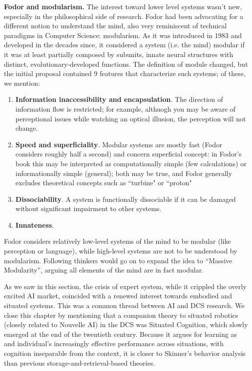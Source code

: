 \documentclass[../main.tex]{subfiles}
\begin{document}
\vspace{4pt}
\textbf{Fodor and modularism.}
The interest toward lower level systems wasn't new, especially in the philosophical side of research. Fodor had been advocating for a different notion to understand the mind, also very reminiscent of technical paradigms in Computer Science: modularism. As it was introduced in 1983\cite{fodorModularityMind1983} and developed in the decades since, it considered a system (i.e. the mind) modular if it was at least partially composed by subunits, innate neural structures with distinct, evolutionary-developed functions. The definition of module changed, but the initial proposal contained 9 features that characterize such systems; of these, we mention:
\begin{enumerate}
    \item \textbf{Information inaccessibility and encapsulation}. The direction of information flow is restricted; for example, althuogh you may be aware of perceptional issues while watching an optical illusion, the perception will not change.
    \item \textbf{Speed and superficiality}. Modular systems are mostly fast (Fodor considers roughly half a second) and concern superficial concept: in Fodor's book this may be interpreted as computationally simple (few calculations) or informationally simple (general); both may be true, and Fodor generally excludes theoretical concepts such as ``turbine" or ``proton"
    \item \textbf{Dissociability}. A system is functionally dissociable if it can be damaged without significant impairment to other systems.
    \item \textbf{Innateness}.
\end{enumerate}
Fodor considers relatively low-level systems of the mind to be modular (like perception or language), while high-level systems are not to be understood by modularism. Following thinkers would go on to expand the idea to ``Massive Modularity'', arguing all elements of the mind are in fact modular.

\vspace{5pt}
As we saw in this section, the crisis of expert system, while it crippled the overly excited AI market, coincided with a renewed interest towards embodied and situated systems. This was a common thread between AI and DCS research. We close this chapter by mentioning that a companion theory to situated robotics (closely related to Nouvelle AI) in the DCS was Situated Cognition, which slowly emerged at the end of the twentieth century. Because it argues for learning as and individual's increasingly effective performance across situations, with cognition inseparable from the context, it is closer to Skinner's behavior analysis than previous storage-and-retrieval-based theories.
\end{document}
